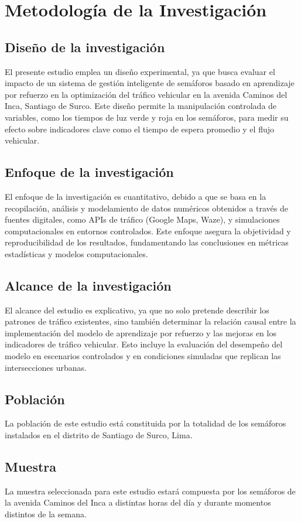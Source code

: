\chapter{Metodología de la Investigación}

\section{Diseño de la investigación}
El presente estudio emplea un diseño experimental, ya que busca evaluar el impacto de un sistema de gestión inteligente de semáforos basado en aprendizaje por refuerzo en la optimización del tráfico vehicular en la avenida Caminos del Inca, Santiago de Surco. Este diseño permite la manipulación controlada de variables, como los tiempos de luz verde y roja en los semáforos, para medir su efecto sobre indicadores clave como el tiempo de espera promedio y el flujo vehicular.
\section{Enfoque de la investigación}
El enfoque de la investigación es cuantitativo, debido a que se basa en la recopilación, análisis y modelamiento de datos numéricos obtenidos a través de fuentes digitales, como APIs de tráfico (Google Maps, Waze), y simulaciones computacionales en entornos controlados. Este enfoque asegura la objetividad y reproducibilidad de los resultados, fundamentando las conclusiones en métricas estadísticas y modelos computacionales.
\section{Alcance de la investigación}
El alcance del estudio es explicativo, ya que no solo pretende describir los patrones de tráfico existentes, sino también determinar la relación causal entre la implementación del modelo de aprendizaje por refuerzo y las mejoras en los indicadores de tráfico vehicular. Esto incluye la evaluación del desempeño del modelo en escenarios controlados y en condiciones simuladas que replican las intersecciones urbanas.
\section{Población}
La población de este estudio está constituida por la totalidad de los semáforos instalados en el distrito de Santiago de Surco, Lima. 
\section{Muestra}
La muestra seleccionada para este estudio estará compuesta por los semáforos de la avenida Caminos del Inca a distintas horas del día y durante momentos distintos de la semana.

